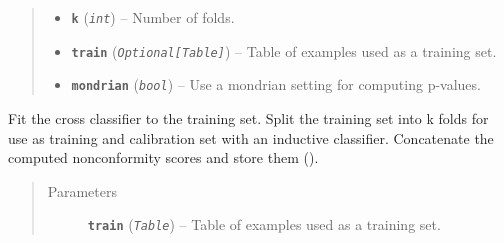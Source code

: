 \documentclass[letterpaper,10pt,english]{sphinxmanual}
\begin{document}
\begin{fulllineitems}
\begin{fulllineitems}
\begin{quote}
\begin{description}
\begin{itemize}
\item {} 
\textbf{\texttt{k}} (\emph{\texttt{int}}) -- Number of folds.

\item {} 
\textbf{\texttt{train}} (\emph{\texttt{Optional{[}Table{]}}}) -- Table of examples used as a training set.

\item {} 
\textbf{\texttt{mondrian}} (\emph{\texttt{bool}}) -- Use a mondrian setting for computing p-values.

\end{itemize}

\end{description}\end{quote}

\end{fulllineitems}


\begin{fulllineitems}
\label{cp.classification:cp.classification.CrossClassifier.fit}
Fit the cross classifier to the training set. Split the training set into k folds for use as
training and calibration set with an inductive classifier. Concatenate the computed nonconformity scores
and store them ({\hyperref[cp.classification:cp.classification.InductiveClassifier.alpha]{}}).
\begin{quote}\begin{description}
\item[{Parameters}] \leavevmode
\textbf{\texttt{train}} (\emph{\texttt{Table}}) -- Table of examples used as a training set.

\end{description}\end{quote}

\end{fulllineitems}


\end{fulllineitems}

\end{document}
